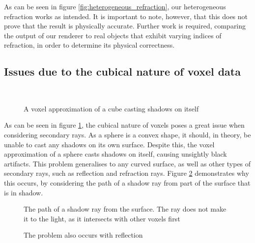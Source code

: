 As can be seen in figure \ref{fig:heterogeneous_refraction}, our heterogeneous refraction works as intended. It is important to note, however, that this does not prove that the result is physically accurate. Further work is required, comparing the output of our renderer to real objects that exhibit varying indices of refraction, in order to determine its physical correctness.

\subsection{Issues due to the cubical nature of voxel data}

\begin{figure}
	\centering
	~

	\caption{A voxel approximation of a cube casting shadows on itself}
	\label{fig:shadow-problem}
\end{figure}

As can be seen in figure \ref{fig:shadow-problem}, the cubical nature of voxels poses a great issue when considering secondary rays. As a sphere is a convex shape, it should, in theory, be unable to cast any shadows on its own surface. Despite this, the voxel approximation of a sphere casts shadows on itself, causing unsightly black artifacts. This problem generalises to any curved surface, as well as other types of secondary rays, such as reflection and refraction rays. Figure \ref{fig:shadow-problem-ray-path} demonstrates why this occurs, by considering the path of a shadow ray from part of the surface that is in shadow.

\begin{figure}
	\centering

	\caption{The path of a shadow ray from the surface. The ray does not make it to the light, as it intersects with other voxels first}
	\label{fig:shadow-problem-ray-path}
\end{figure}

\begin{figure}
	\centering

	\caption{The problem also occurs with reflection}
	\label{fig:shadow-problem-reflection}
\end{figure}


